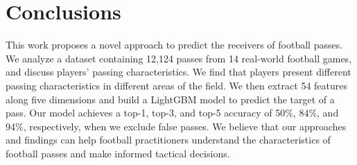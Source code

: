 \section{Conclusions} \label{conclusions}

This work proposes a novel approach to predict the receivers of football passes.
We analyze a dataset containing 12,124 passes from 14 real-world football games, and discuss players' passing characteristics. We find that players present different passing characteristics in different areas of the field.
We then extract 54 features along five dimensions and build a LightGBM model to predict the target of a pass. 
Our model achieves a top-1, top-3, and top-5 accuracy of 50\%, 84\%, and 94\%, respectively, when we exclude false passes.
We believe that our approaches and findings can help football practitioners understand the characteristics of football passes and make informed tactical decisions.